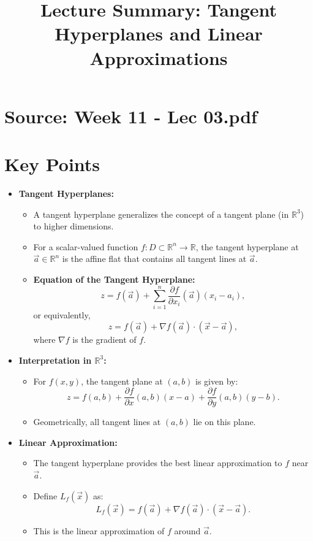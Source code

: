 \documentclass{article}
\title{Lecture Summary: Tangent Hyperplanes and Linear Approximations}
\author{}
\date{}
\begin{document}
\maketitle

\section*{Source: Week 11 - Lec 03.pdf}

\section*{Key Points}

\begin{itemize}
  \item \textbf{Tangent Hyperplanes:}
    \begin{itemize}
      \item A tangent hyperplane generalizes the concept of a tangent plane (in $\mathbb{R}^3$) to higher dimensions.
      \item For a scalar-valued function $f: D \subset \mathbb{R}^n \to \mathbb{R}$, the tangent hyperplane at $\vec{a} \in \mathbb{R}^n$ is the affine flat that contains all tangent lines at $\vec{a}$.

      \item \textbf{Equation of the Tangent Hyperplane:}
        \[
          z = f(\vec{a}) + \sum_{i=1}^n \frac{\partial f}{\partial x_i}(\vec{a})(x_i - a_i),
        \]
        or equivalently,
        \[
          z = f(\vec{a}) + \nabla f(\vec{a}) \cdot (\vec{x} - \vec{a}),
        \]
        where $\nabla f$ is the gradient of $f$.
    \end{itemize}

  \item \textbf{Interpretation in $\mathbb{R}^3$:}
    \begin{itemize}
      \item For $f(x, y)$, the tangent plane at $(a, b)$ is given by:
        \[
          z = f(a, b) + \frac{\partial f}{\partial x}(a, b)(x - a) + \frac{\partial f}{\partial y}(a, b)(y - b).
        \]
      \item Geometrically, all tangent lines at $(a, b)$ lie on this plane.
    \end{itemize}

  \item \textbf{Linear Approximation:}
    \begin{itemize}
      \item The tangent hyperplane provides the best linear approximation to $f$ near $\vec{a}$.
      \item Define $L_f(\vec{x})$ as:
        \[
          L_f(\vec{x}) = f(\vec{a}) + \nabla f(\vec{a}) \cdot (\vec{x} - \vec{a}).
        \]
      \item This is the linear approximation of $f$ around $\vec{a}$.
    \end{itemize}


\end{itemize}
\end{document}
